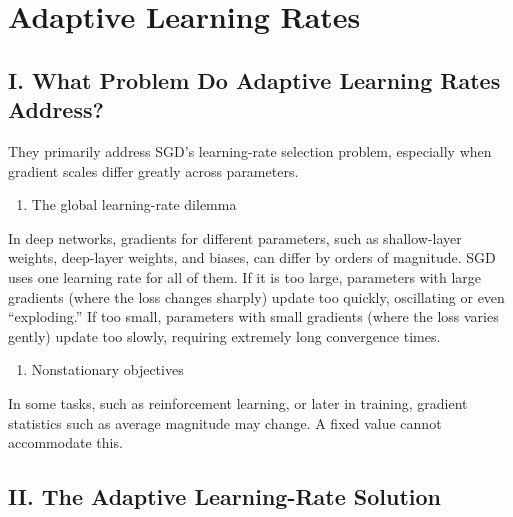 \setcounter{section}{2}

\hypertarget{adaptive-learning-rates}{%
\section{Adaptive Learning Rates}\label{adaptive-learning-rates}}

\hypertarget{i.-what-problem-do-adaptive-learning-rates-address}{%
\subsection{I. What Problem Do Adaptive Learning Rates Address?}\label{i.-what-problem-do-adaptive-learning-rates-address}}

They primarily address SGD's learning-rate selection problem, especially when gradient scales differ greatly across parameters.

\begin{enumerate}
\def\labelenumi{\arabic{enumi}.}
\tightlist
\item
  The global learning-rate dilemma
\end{enumerate}

In deep networks, gradients for different parameters, such as shallow-layer weights, deep-layer weights, and biases, can differ by orders of magnitude. SGD uses one learning rate for all of them. If it is too large, parameters with large gradients (where the loss changes sharply) update too quickly, oscillating or even ``exploding.'' If too small, parameters with small gradients (where the loss varies gently) update too slowly, requiring extremely long convergence times.

\begin{enumerate}
\def\labelenumi{\arabic{enumi}.}
\setcounter{enumi}{1}
\tightlist
\item
  Nonstationary objectives
\end{enumerate}

In some tasks, such as reinforcement learning, or later in training, gradient statistics such as average magnitude may change. A fixed value cannot accommodate this.

\hypertarget{ii.-the-adaptive-learning-rate-solution}{%
\subsection{II. The Adaptive Learning-Rate Solution}\label{ii.-the-adaptive-learning-rate-solution}}

